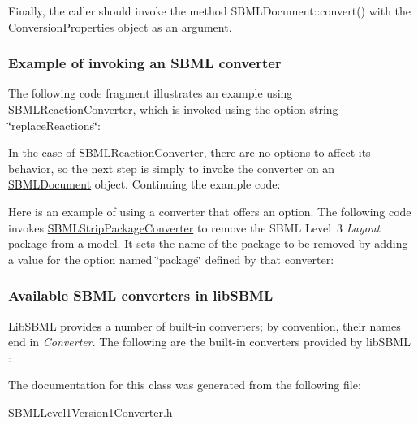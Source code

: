 Finally, the caller should invoke the method S\+B\+M\+L\+Document\+::convert() with the \hyperlink{class_conversion_properties}{Conversion\+Properties} object as an argument.\hypertarget{classdoc__section__using__sbml__converters_converter-example}{}\subsubsection{Example of invoking an S\+B\+M\+L converter}\label{classdoc__section__using__sbml__converters_converter-example}
The following code fragment illustrates an example using \hyperlink{class_s_b_m_l_reaction_converter}{S\+B\+M\+L\+Reaction\+Converter}, which is invoked using the option string {\ttfamily \char`\"{}replace\+Reactions\char`\"{}}\+:

In the case of \hyperlink{class_s_b_m_l_reaction_converter}{S\+B\+M\+L\+Reaction\+Converter}, there are no options to affect its behavior, so the next step is simply to invoke the converter on an \hyperlink{class_s_b_m_l_document}{S\+B\+M\+L\+Document} object. Continuing the example code\+:

Here is an example of using a converter that offers an option. The following code invokes \hyperlink{class_s_b_m_l_strip_package_converter}{S\+B\+M\+L\+Strip\+Package\+Converter} to remove the S\+B\+ML Level~3 {\itshape Layout} package from a model. It sets the name of the package to be removed by adding a value for the option named {\ttfamily \char`\"{}package\char`\"{}} defined by that converter\+:\hypertarget{classdoc__section__using__sbml__converters_available-converters}{}\subsubsection{Available S\+B\+M\+L converters in lib\+S\+B\+ML}\label{classdoc__section__using__sbml__converters_available-converters}
Lib\+S\+B\+ML provides a number of built-\/in converters; by convention, their names end in {\itshape Converter}. The following are the built-\/in converters provided by lib\+S\+B\+ML \+:

The documentation for this class was generated from the following file\+:\begin{DoxyCompactItemize}
\item 
\hyperlink{_s_b_m_l_level1_version1_converter_8h}{S\+B\+M\+L\+Level1\+Version1\+Converter.\+h}\end{DoxyCompactItemize}
